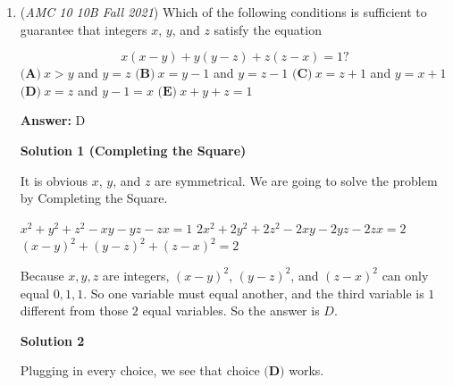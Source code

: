 \begin{enumerate}
 We seek $2A(\text{Hexagon})-\pi,$ which is $\boxed{\textbf{(B) }3 \sqrt{3} - \pi}$




\textbf{Solution 5}

Use the diagrams provided in Solution $1$.

 The problem wants the area of the region bounded by the $6$ reflected arcs, a.k.a the area of the hexagon minus the area of the arcs drawn in the first figure. The area of those arcs can be calculated by taking the total area of the circle minus the total area of the hexagon.

 In the end, we are looking for the value of the (area of the hexagon)-((area of the circle)-(area of the hexagon)).

 The area of a hexagon with side length $1$ is $\frac{3\sqrt{3}}{2}$. The area of a circle with radius $1$ is $\pi$.

 $\frac{3\sqrt{3}}{2}-(\pi-\frac{3\sqrt{3}}{2})=3\sqrt{3}-\pi$.

 The answer is $\boxed{\textbf{(B) }3\sqrt{3}-\pi}$.

 


	\item (\textit{AMC 10 10B Fall 2021}) Which of the following conditions is sufficient to guarantee that integers $x$, $y$, and $z$ satisfy the equation

 \[x(x-y)+y(y-z)+z(z-x) = 1?\]
$\textbf{(A)} \: x>y$ and $y=z$
$\textbf{(B)} \: x=y-1$ and $y=z-1$
$\textbf{(C)} \: x=z+1$ and $y=x+1$
$\textbf{(D)} \: x=z$ and $y-1=x$
$\textbf{(E)} \: x+y+z=1$

 \textbf{Answer: }D



\textbf{Solution 1 (Completing the Square)}

It is obvious $x$, $y$, and $z$ are symmetrical. We are going to solve the problem by Completing the Square.

 $x ^ 2 + y ^ 2 + z ^ 2 - xy - yz - zx = 1$
$2x ^ 2 + 2y ^ 2 + 2z ^ 2 - 2xy - 2yz - 2zx = 2$
$(x-y)^2 + (y-z)^2 + (z-x)^2 = 2$

 Because $x, y, z$ are integers, $(x-y)^2$, $(y-z)^2$, and $(z-x)^2$ can only equal $0, 1, 1$. So one variable must equal another, and the third variable is $1$ different from those $2$ equal variables. So the answer is $\boxed{D}$.

 



\textbf{Solution 2}

Plugging in every choice, we see that choice $\textbf{(D)}$ works. 


\end{enumerate}
